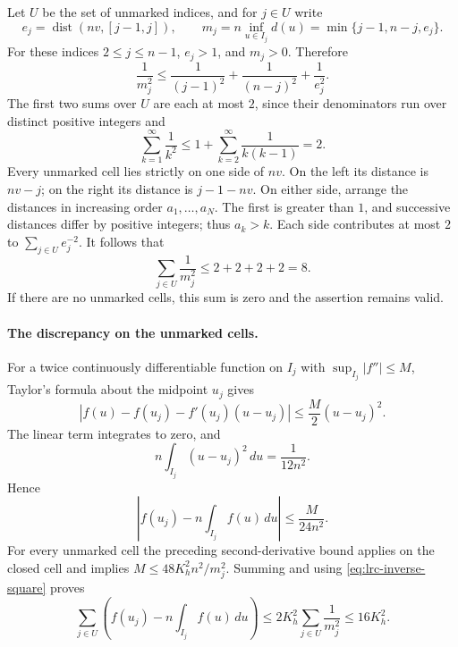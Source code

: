 Let $U$ be the set of unmarked indices, and for $j\in U$ write
\[
 e_j=\operatorname{dist}(nv,[j-1,j]),\qquad
 m_j=n\inf_{u\in I_j}d(u)
     =\min\{j-1,n-j,e_j\}.
\]
For these indices $2\leq j\leq n-1$, $e_j>1$, and $m_j>0$.
Therefore
\[
 \frac1{m_j^2}
 \leq\frac1{(j-1)^2}+\frac1{(n-j)^2}+\frac1{e_j^2}.
\]
The first two sums over $U$ are each at most $2$, since their
denominators run over distinct positive integers and
\[
 \sum_{k=1}^{\infty}\frac1{k^2}
 \leq1+\sum_{k=2}^{\infty}\frac1{k(k-1)}=2.
\]
Every unmarked cell lies strictly on one side of $nv$. On the left
its distance is $nv-j$; on the right its distance is $j-1-nv$.
On either side, arrange the distances in increasing order
$a_1,\ldots,a_N$. The first is greater than $1$, and successive
distances differ by positive integers; thus $a_k>k$.
Each side contributes at most $2$ to $\sum_{j\in U}e_j^{-2}$.
It follows that
\begin{equation}\label{eq:lrc-inverse-square}
 \sum_{j\in U}\frac1{m_j^2}\leq2+2+2+2=8.
\end{equation}
If there are no unmarked cells, this sum is zero and the assertion
remains valid.

\paragraph{The discrepancy on the unmarked cells.}
For a twice continuously differentiable function on $I_j$ with
$\sup_{I_j}|f''|\leq M$, Taylor's formula about the midpoint $u_j$
gives
\[
 |f(u)-f(u_j)-f'(u_j)(u-u_j)|\leq\frac M2(u-u_j)^2.
\]
The linear term integrates to zero, and
\[
 n\int_{I_j}(u-u_j)^2\,du=\frac1{12n^2}.
\]
Hence
\[
 \left|f(u_j)-n\int_{I_j}f(u)\,du\right|
 \leq\frac{M}{24n^2}.
\]
For every unmarked cell the preceding second-derivative bound
applies on the closed cell and implies
$M\leq48K_h^2n^2/m_j^2$. Summing and using
\eqref{eq:lrc-inverse-square} proves
\begin{equation}\label{eq:lrc-unmarked-total}
 \sum_{j\in U}\left(f(u_j)-n\int_{I_j}f(u)\,du\right)
 \leq2K_h^2\sum_{j\in U}\frac1{m_j^2}
 \leq16K_h^2.
\end{equation}

